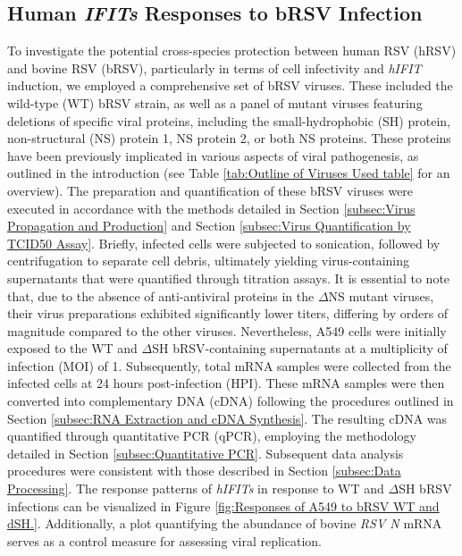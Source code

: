 \subsection{Human \textit{IFITs} Responses to bRSV Infection} \label{subsec:Human IFITs Responses to bRSV}
To investigate the potential cross-species protection between human RSV (hRSV) and bovine RSV (bRSV), particularly in terms of cell infectivity and \textit{hIFIT} induction, we employed a comprehensive set of bRSV viruses. These included the wild-type (WT) bRSV strain, as well as a panel of mutant viruses featuring deletions of specific viral proteins, including the small-hydrophobic (SH) protein, non-structural (NS) protein 1, NS protein 2, or both NS proteins. These proteins have been previously implicated in various aspects of viral pathogenesis, as outlined in the introduction (see Table \ref{tab:Outline of Viruses Used table} for an overview). The preparation and quantification of these bRSV viruses were executed in accordance with the methods detailed in Section \ref{subsec:Virus Propagation and Production} and Section \ref{subsec:Virus Quantification by TCID50 Assay}. Briefly, infected cells were subjected to sonication, followed by centrifugation to separate cell debris, ultimately yielding virus-containing supernatants that were quantified through titration assays. It is essential to note that, due to the absence of anti-antiviral proteins in the \(\Delta\)NS mutant viruses, their virus preparations exhibited significantly lower titers, differing by orders of magnitude compared to the other viruses. Nevertheless, A549 cells were initially exposed to the WT and \(\Delta\)SH bRSV-containing supernatants at a multiplicity of infection (MOI) of 1. Subsequently, total mRNA samples were collected from the infected cells at 24 hours post-infection (HPI). These mRNA samples were then converted into complementary DNA (cDNA) following the procedures outlined in Section \ref{subsec:RNA Extraction and cDNA Synthesis}. The resulting cDNA was quantified through quantitative PCR (qPCR), employing the methodology detailed in Section \ref{subsec:Quantitative PCR}. Subsequent data analysis procedures were consistent with those described in Section \ref{subsec:Data Processing}. The response patterns of \textit{hIFITs} in response to WT and \(\Delta\)SH bRSV infections can be visualized in Figure \ref{fig:Responses of A549 to bRSV WT and dSH.}. Additionally, a plot quantifying the abundance of bovine \textit{RSV N} mRNA serves as a control measure for assessing viral replication.

